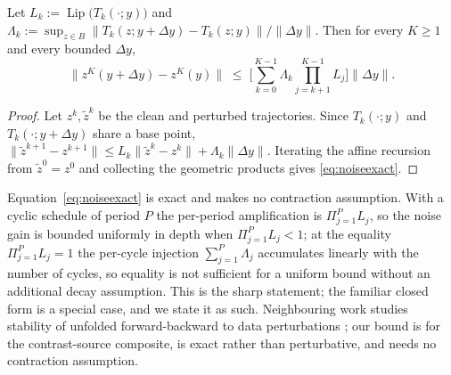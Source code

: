 \documentclass[journal,cmes,article,submit,moreauthors,pdftex]{Definitions/tsp}
\newcommand{\norm}[1]{\lVert #1 \rVert}
\begin{document}
\begin{Proposition}\label{prop:noise}
Let $L_k:=\operatorname{Lip}\big(T_k(\cdot;y)\big)$ and
$\Lambda_k:=\sup_{z\in B}\norm{T_k(z;y+\Delta y)-T_k(z;y)}/\norm{\Delta y}$. Then for every
$K\ge1$ and every bounded $\Delta y$,
\begin{equation}\label{eq:noiseexact}
\norm{z^{K}(y+\Delta y)-z^{K}(y)}
\;\le\;\Big[\sum_{k=0}^{K-1}\Lambda_k\!\!\prod_{j=k+1}^{K-1}\!\!L_j\Big]\norm{\Delta y}.
\end{equation}
\end{Proposition}
\begin{proof}
Let $z^{k},\tilde z^{k}$ be the clean and perturbed trajectories. Since $T_k(\cdot;y)$ and
$T_k(\cdot;y+\Delta y)$ share a base point,
$\norm{\tilde z^{k+1}-z^{k+1}}
\le L_k\norm{\tilde z^{k}-z^{k}}+\Lambda_k\norm{\Delta y}$. Iterating the affine recursion from
$\tilde z^{0}=z^{0}$ and collecting the geometric products gives \eqref{eq:noiseexact}.
\end{proof}
Equation~\eqref{eq:noiseexact} is exact and makes no contraction assumption. With a cyclic schedule
of period $P$ the per-period amplification is $\Pi_{j=1}^{P}L_j$, so the noise gain is bounded
uniformly in depth when $\Pi_{j=1}^{P}L_j<1$; at the equality $\Pi_{j=1}^{P}L_j=1$ the per-cycle
injection $\sum_{j=1}^{P}\Lambda_j$ accumulates linearly with the number of cycles, so equality is
not sufficient for a uniform bound without an additional decay assumption. This is the sharp
statement; the familiar closed form is a special case, and we state it as such. Neighbouring work studies stability of unfolded forward-backward to data perturbations \cite{devalle2023}; our bound is for the contrast-source composite, is exact rather than perturbative, and needs no contraction assumption.
\end{document}
